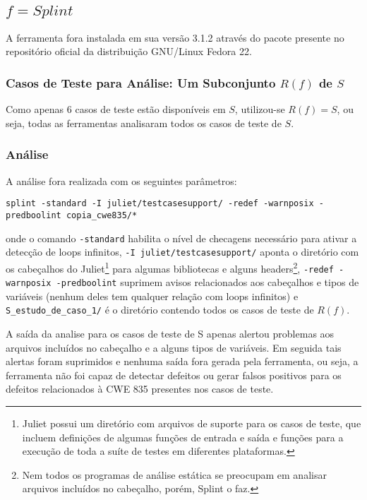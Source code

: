 \subsection{$f = Splint$}

A ferramenta fora instalada em sua versão 3.1.2 através do pacote presente no repositório oficial da distribuição GNU/Linux Fedora 22.

\subsubsection{Casos de Teste para Análise: Um Subconjunto $R(f)$ de $S$}

Como apenas 6 casos de teste estão disponíveis em $S$, utilizou-se $R(f) = S$, ou seja, todas as ferramentas analisaram todos os casos de teste de $S$.

\subsubsection{Análise}

A análise fora realizada com os seguintes parâmetros:

\lstinline{splint -standard -I juliet/testcasesupport/ -redef -warnposix -predboolint copia_cwe835/*}

onde o comando \lstinline{-standard} habilita o nível de checagens necessário para ativar a detecção de loops infinitos, \lstinline{-I juliet/testcasesupport/} aponta o diretório com os cabeçalhos do Juliet\footnote{Juliet possui um diretório com arquivos de suporte para os casos de teste, que incluem definições de algumas funções de entrada e saída e funções para a execução de toda a suíte de testes em diferentes plataformas.} para algumas bibliotecas e alguns headers\footnote{Nem todos os programas de análise estática se preocupam em analisar arquivos incluídos no cabeçalho, porém, Splint o faz.}, \lstinline{-redef -warnposix -predboolint} suprimem avisos relacionados aos cabeçalhos e tipos de variáveis (nenhum deles tem qualquer relação com loops infinitos) e \lstinline{S_estudo_de_caso_1/} é o diretório contendo todos os casos de teste de $R(f)$.

A saída da analise para os casos de teste de S apenas alertou problemas aos arquivos incluídos no cabeçalho e a alguns tipos de variáveis. Em seguida tais alertas foram suprimidos e nenhuma saída fora gerada pela ferramenta, ou seja, a ferramenta não foi capaz de detectar defeitos ou gerar falsos positivos para os defeitos relacionados à CWE 835 presentes nos casos de teste.

